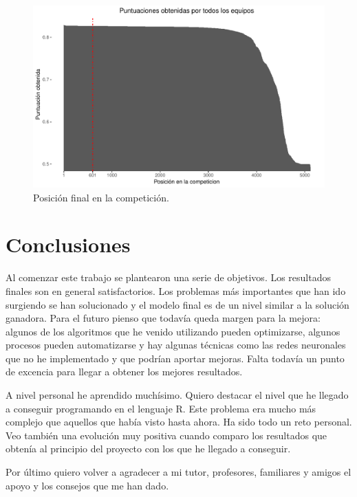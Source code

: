 \documentclass[11pt,a4paper,spanish]{article} %
\begin{document}
\vspace{1cm}

\begin{figure}[h!]
	\begin{center}
	\includegraphics[width=\textwidth]{Z_07_01_Posicion_competicion.pdf}
    \caption{Posición final en la competición.}
    \end{center}
\end{figure}

\newpage

\section{Conclusiones}
Al comenzar este trabajo se plantearon una serie de objetivos. Los resultados finales son en general satisfactorios. Los problemas más importantes que han ido surgiendo se han solucionado y el modelo final es de un nivel similar a la solución ganadora. Para el futuro pienso que todavía queda margen para la mejora: algunos de los algoritmos que he venido utilizando pueden optimizarse, algunos procesos pueden automatizarse y hay algunas técnicas como las redes neuronales que no he implementado y que podrían aportar mejoras. Falta todavía un punto de excencia para llegar a obtener los mejores resultados. 

A nivel personal he aprendido muchísimo. Quiero destacar el nivel que he llegado a conseguir programando en el lenguaje R. Este problema era mucho más complejo que aquellos que había visto hasta ahora. Ha sido todo un reto personal. Veo también una evolución muy positiva cuando comparo los resultados que obtenía al principio del proyecto con los que he llegado a conseguir. 

Por último quiero volver a agradecer a mi tutor, profesores, familiares y amigos el apoyo y los consejos que me han dado. 
\end{document}
